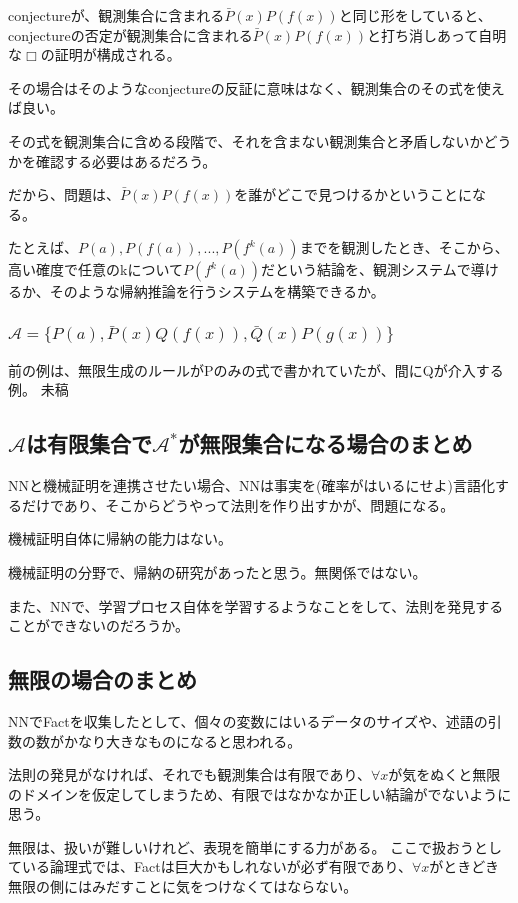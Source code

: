 \documentclass[10pt, oneside]{jarticle}   	%
\theoremstyle{definition}
\newcommand{\cont}{\Box}
\newcommand{\eset}[1]{\{{#1}\}}
\newcommand{\clos}[1]{\mathcal{#1}^{*}}
\begin{document}
conjectureが、観測集合に含まれる$\bar{P}(x)P(f(x))$と同じ形をしていると、conjectureの否定が観測集合に含まれる$\bar{P}(x)P(f(x))$と打ち消しあって自明な$\cont$の証明が構成される。

その場合はそのようなconjectureの反証に意味はなく、観測集合のその式を使えば良い。

その式を観測集合に含める段階で、それを含まない観測集合と矛盾しないかどうかを確認する必要はあるだろう。

だから、問題は、$\bar{P}(x)P(f(x))$を誰がどこで見つけるかということになる。

たとえば、$P(a),P(f(a)),...,P(f^k(a))$までを観測したとき、そこから、高い確度で任意のkについて$P(f^k(a))$だという結論を、観測システムで導けるか、そのような帰納推論を行うシステムを構築できるか。


\subsubsection{$\mathcal{A}=\eset{P(a), \bar{P}(x)Q(f(x)), \bar{Q}(x)P(g(x))}$}
前の例は、無限生成のルールがPのみの式で書かれていたが、間にQが介入する例。
未稿

\subsection{$\mathcal{A}$は有限集合で$\clos{A}$が無限集合になる場合のまとめ}

NNと機械証明を連携させたい場合、NNは事実を(確率がはいるにせよ)言語化するだけであり、そこからどうやって法則を作り出すかが、問題になる。

機械証明自体に帰納の能力はない。

機械証明の分野で、帰納の研究があったと思う。無関係ではない。

また、NNで、学習プロセス自体を学習するようなことをして、法則を発見することができないのだろうか。



\subsection{無限の場合のまとめ}
NNでFactを収集したとして、個々の変数にはいるデータのサイズや、述語の引数の数がかなり大きなものになると思われる。

法則の発見がなければ、それでも観測集合は有限であり、$\forall x$が気をぬくと無限のドメインを仮定してしまうため、有限ではなかなか正しい結論がでないように思う。

無限は、扱いが難しいけれど、表現を簡単にする力がある。
ここで扱おうとしている論理式では、Factは巨大かもしれないが必ず有限であり、$\forall x$がときどき無限の側にはみだすことに気をつけなくてはならない。
\end{document}

